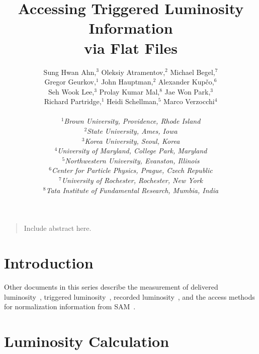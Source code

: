 \documentclass[12pt]{article}
\begin{document}
\title{Accessing Triggered Luminosity Information \\ via Flat Files}
\author{Sung Hwan Ahn,$^3$ 
	Oleksiy Atramentov,$^2$ 
	Michael Begel,$^7$ \\
	Gregor Geurkov,$^1$ 
	John Hauptman,$^2$ 
	Alexander Kup\v{c}o,$^6$ \\
	Seh Wook Lee,$^3$ 
	Prolay Kumar Mal,$^8$ 
	Jae Won Park,$^3$ \\
	Richard Partridge,$^1$ 
	Heidi Schellman,$^5$ 
	Marco Verzocchi$^4$
\\
\\ $^1${\it\small Brown University, Providence, Rhode Island}
\\ $^2${\it\small State University, Ames, Iowa}
\\ $^3${\it\small Korea University, Seoul, Korea}
\\ $^4${\it\small University of Maryland, College Park, Maryland}
\\ $^5${\it\small Northwestern University, Evanston, Illinois}
\\ $^6${\it\small Center for Particle Physics, Prague, Czech Republic}
\\ $^7${\it\small University of Rochester, Rochester, New York}
\\ $^8${\it\small Tata Institute of Fundamental Research, Mumbia, India}
}
\maketitle
\thispagestyle{myheadings}

\begin{quote}
Include abstract here.
\end{quote}

\section{Introduction}

Other documents in this series describe the measurement of delivered
luminosity~\cite{3970}, triggered luminosity~\cite{3971}, recorded
luminosity~\cite{3972}, and the access methods for normalization
information from SAM~\cite{3465,3937}.

\section{Luminosity Calculation}
\end{document}
